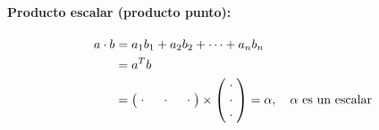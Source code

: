 \paragraph*{Producto escalar (producto punto):}

\begin{align*}
    a \cdot b &= a_1b_1 + a_2b_2 + \cdots + a_nb_n \\
    &= a^Tb \\
    &= \begin{pmatrix} \hspace*{0.1cm}\cdot\hspace*{0.1cm} & \hspace*{0.1cm}\cdot\hspace*{0.1cm} & \hspace*{0.1cm}\cdot\hspace*{0.1cm} \end{pmatrix} \times \begin{pmatrix} \hspace*{0.1cm}\cdot\hspace*{0.1cm} \\ \hspace*{0.1cm}\cdot\hspace*{0.1cm} \\ \hspace*{0.1cm}\cdot\hspace*{0.1cm} \end{pmatrix} = \alpha, \quad \alpha \text{ es un escalar}
\end{align*}


